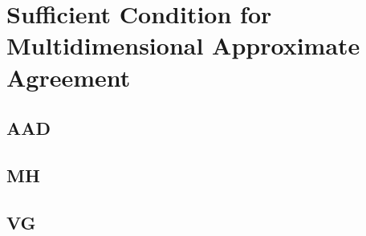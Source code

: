 \section{Sufficient Condition for Multidimensional Approximate Agreement}
\subsection{AAD}
\subsection{MH}
\subsection{VG}

